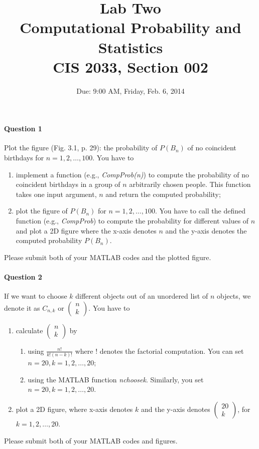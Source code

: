 \documentclass[11pt]{article} %
\title{Lab Two\\
Computational Probability and Statistics \\
CIS 2033, Section 002}
\author{Due: 9:00 AM, Friday, Feb. 6, 2014}
\date{} %
\begin{document}
\maketitle

\paragraph*{Question 1}
Plot the figure (Fig. 3.1, p. 29): the probability of $P(B_n)$ of no coincident birthdays for $n=1, 2, \ldots, 100$. You have to 
\begin{enumerate}
\item implement a function (e.g., {\it CompProb(n)}) to compute the probability of no coincident birthdays in a group of $n$ arbitrarily chosen people. This function takes one input argument, $n$ and return the computed probability; 
\item plot the figure of $P(B_n)$ for $n=1,2, \ldots, 100$. You have to call the defined function (e.g., {\it CompProb}) to compute the probability for different values of $n$ and plot a 2D figure where the x-axis denotes $n$ and the y-axis denotes the computed probability $P(B_n)$.
\end{enumerate}
Please submit both of your MATLAB codes and the plotted figure. 

\paragraph*{Question 2}
If we want to choose $k$ different objects out of an unordered list of $n$ objects, we denote it as $C_{n,k}$ or $\left( \begin{array}{c} n\\k \end{array} \right)$. You have to 
\begin{enumerate}
\item calculate $\left( \begin{array}{c} n\\k \end{array} \right)$ by 
\begin{enumerate}
\item using $\frac{n!}{k!(n-k)!}$ where $!$ denotes the factorial computation. You can set $n=20, k = 1, 2, \ldots, 20$;
\item using the MATLAB function {\it nchoosek}. Similarly, you set $n= 20, k = 1, 2, \ldots, 20$. 
\end{enumerate}
\item plot a 2D figure, where x-axis denotes $k$ and the y-axis denotes $\left( \begin{array}{c} 20\\k \end{array} \right)$, for $k = 1, 2, \ldots, 20$.
\end{enumerate}
Please submit both of your MATLAB codes and figures. 
\end{document}
